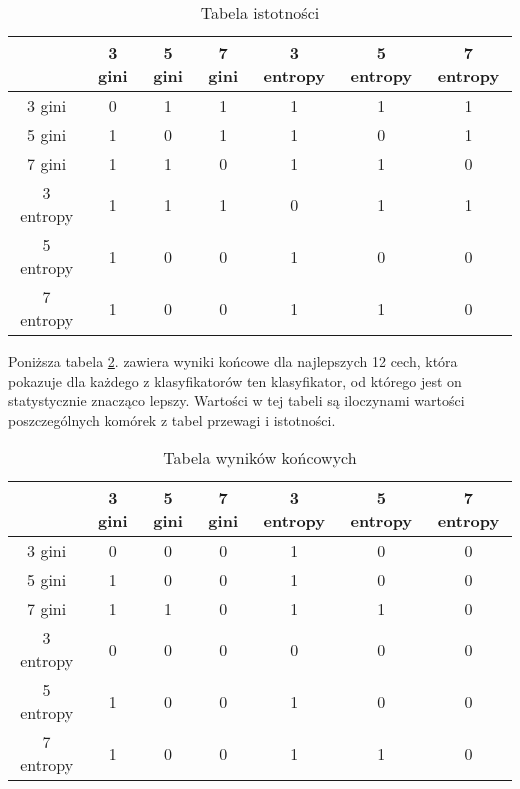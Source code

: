 \documentclass{article}
\begin{document}
\begin{center}
\begin{longtable}{c|c|c|c|c|c|c|}
\caption{Tabela istotności}
		\label{tab:istotnosc}\\
\cline{2-7}
                                & 3 gini & 5 gini & 7 gini & 3 entropy & 5 entropy & 7 entropy \\ \hline
\multicolumn{1}{|c|}{3 gini}    & 0      & 1       & 1       & 1          & 1          & 1          \\ \hline
\multicolumn{1}{|c|}{5 gini}    & 1       & 0      & 1       & 1          & 0          & 1          \\ \hline
\multicolumn{1}{|c|}{7 gini}    & 1       & 1       & 0      & 1          & 1          & 0          \\ \hline
\multicolumn{1}{|c|}{3 entropy} & 1       & 1       & 1       & 0         & 1          & 1          \\ \hline
\multicolumn{1}{|c|}{5 entropy} & 1       & 0       & 0       & 1          & 0         & 0          \\ \hline
\multicolumn{1}{|c|}{7 entropy} & 1       & 0       & 0       & 1          & 1          & 0         \\ \hline
\end{longtable}
\end{center}

Poniższa tabela \ref{tab:wynikiKoncowe}. zawiera wyniki końcowe dla najlepszych 12 cech, która pokazuje dla każdego z klasyfikatorów ten klasyfikator, od którego jest on statystycznie znacząco lepszy. Wartości w tej tabeli są iloczynami wartości poszczególnych komórek z tabel przewagi i istotności.

\begin{center}
\begin{longtable}{c|c|c|c|c|c|c|}
\caption{Tabela wyników końcowych}
		\label{tab:wynikiKoncowe}\\
\cline{2-7}
                                & 3 gini & 5 gini & 7 gini & 3 entropy & 5 entropy & 7 entropy \\ \hline
\multicolumn{1}{|c|}{3 gini}    & 0      & 0      & 0       & 1          & 0          & 0          \\ \hline
\multicolumn{1}{|c|}{5 gini}    & 1       & 0      & 0       & 1          & 0          & 0       \\ \hline
\multicolumn{1}{|c|}{7 gini}    & 1       & 1       & 0      & 1          & 1          & 0          \\ \hline
\multicolumn{1}{|c|}{3 entropy} & 0       & 0       & 0       & 0         & 0           & 0          \\ \hline
\multicolumn{1}{|c|}{5 entropy} & 1       & 0       & 0       & 1          & 0         & 0          \\ \hline
\multicolumn{1}{|c|}{7 entropy} & 1       & 0       & 0       & 1          & 1          & 0         \\ \hline
\end{longtable}
\end{center}
\newpage
\end{document}
